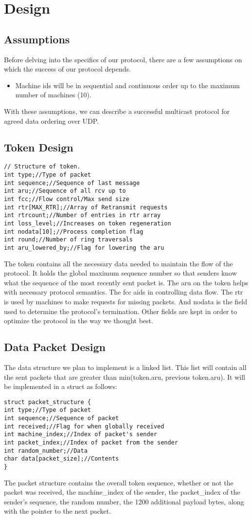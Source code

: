 \documentclass[12pt,journal,compsoc]{IEEEtran}
\begin{document}
\section{Design}
\subsection{Assumptions}
Before delving into the specifics of our protocol, there are a few assumptions on which the success of our protocol depends.
\begin{itemize}
\item Machine ids will be in sequential and continuous order up to the maximum number of machines (10).
\end{itemize}
With these assumptions, we can describe a successful multicast protocol for agreed data ordering over UDP.
\subsection{Token Design}
\begin{lstlisting}
// Structure of token.
int type;//Type of packet
int sequence;//Sequence of last message
int aru;//Sequence of all rcv up to
int fcc;//Flow control/Max send size
int rtr[MAX_RTR];//Array of Retransmit requests
int rtrcount;//Number of entries in rtr array
int loss_level;//Increases on token regeneration
int nodata[10];//Process completion flag
int round;//Number of ring traversals
int aru_lowered_by;//Flag for lowering the aru
\end{lstlisting}
The token contains all the necessary data needed to maintain the flow of the protocol. It holds the global maximum sequence number so that senders know what the sequence of the most recently sent packet is. The aru on the token helps with necessary protocol semantics. The fcc aids in controlling data flow. The rtr is used by machines to make requests for missing packets. And nodata is the field used to determine the protocol's termination. Other fields are kept in order to optimize the protocol in the way we thought best.

\subsection{Data Packet Design}
The data structure we plan to implement is a linked list. This list will contain all the sent packets that are greater than min(token.aru, previous token.aru). It will be implemented in a struct as follows:
\begin{lstlisting}
struct packet_structure {
int type;//Type of packet
int sequence;//Sequence of packet
int received;//Flag for when globally received
int machine_index;//Index of packet's sender
int packet_index;//Index of packet from the sender
int random_number;//Data
char data[packet_size];//Contents
}
\end{lstlisting}
The packet structure contains the overall token sequence, whether or not the packet was received, the machine\_index of the sender, the packet\_index of the sender's sequence, the random number, the 1200 additional payload bytes, along with the pointer to the next packet.
\end{document}
